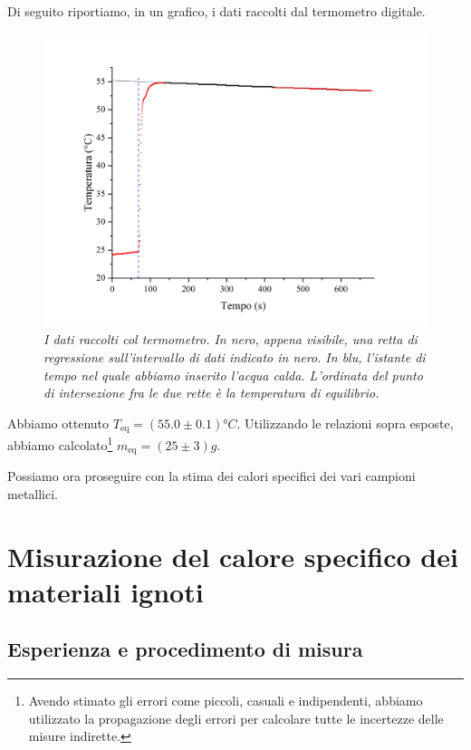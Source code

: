 \documentclass{article}
\begin{document}
Di seguito riportiamo, in un grafico, i dati raccolti dal termometro digitale.

\begin{center}
    \begin{figure}[H]
        \includegraphics[trim={2cm 1cm 2cm 2.1cm},clip,width=\textwidth]{img/RegH2O.jpg}
        \caption{\emph{I dati raccolti col termometro.
        In nero, appena visibile, una retta di regressione sull'intervallo di dati indicato in nero.
        In blu, l'istante di tempo nel quale abbiamo inserito l'acqua calda.
        L'ordinata del punto di intersezione fra le due rette è la temperatura di equilibrio.
        }}
    \end{figure}
\end{center}

Abbiamo ottenuto $T_\text{eq} = \left(55.0\pm0.1\right)\unit{\degree C}$.
Utilizzando le relazioni sopra esposte, abbiamo calcolato\footnote{
    Avendo stimato gli errori come piccoli, casuali e indipendenti,
    abbiamo utilizzato la propagazione degli errori per calcolare tutte le
    incertezze delle misure indirette.
} $m_\text{eq} = \left(25\pm3\right)\unit{g}$.

Possiamo ora proseguire con la stima dei calori specifici dei vari campioni
metallici.

\section{Misurazione del calore specifico dei materiali ignoti}

\subsection{Esperienza e procedimento di misura}
\end{document}
